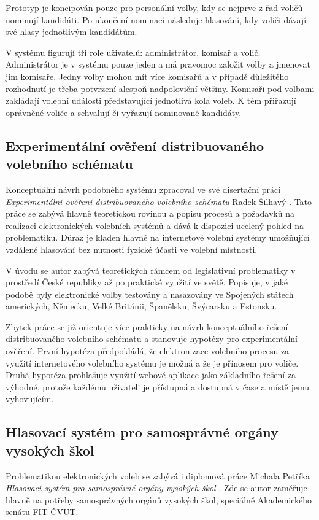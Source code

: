\documentclass[11pt,twoside,a4paper]{book}
\begin{document}
Prototyp je koncipován pouze pro personální volby, kdy se nejprve z řad voličů nominují kandidáti. Po ukončení nominací následuje hlasování, kdy voliči dávají své hlasy jednotlivým kandidátům. 

V systému figurují tři role uživatelů: administrátor, komisař a volič. Administrátor je v systému pouze jeden a má pravomoc založit volby a jmenovat jim komisaře. Jedny volby mohou mít více komisařů a v případě důležitého rozhodnutí je třeba potvrzení alespoň nadpoloviční většiny. Komisaři pod volbami zakládají volební události představující jednotlivá kola voleb. K těm přiřazují oprávněné voliče a schvalují či vyřazují nominované kandidáty.

\subsection{Experimentální ověření distribuovaného volebního schématu}
Konceptuální návrh podobného systému zpracoval ve své disertační práci \textit{Experimentální ověření distribuovaného
volebního schématu} Radek Šilhavý \cite{art:silhavy}. Tato práce se zabývá hlavně teoretickou rovinou a popisu procesů a požadavků na realizaci elektronických volebních systémů a dává k dispozici ucelený pohled na problematiku. Důraz je kladen hlavně na internetové volební systémy umožňující vzdálené hlasování bez nutnosti fyzické účasti ve volební místnosti.

V úvodu se autor zabývá teoretických rámcem od legislativní problematiky v prostředí České republiky až po praktické využití ve světě. Popisuje, v jaké podobě byly elektronické volby testovány a nasazovány ve Spojených státech amerických, Německu, Velké Británii, Španělsku, Švýcarsku a Estonsku.

Zbytek práce se již orientuje více prakticky na návrh konceptuálního řešení distribuovaného volebního schématu a stanovuje hypotézy pro experimentální ověření. První hypotéza předpokládá, že elektronizace volebního procesu za využití internetového volebního systému je možná a že je přínosem pro voliče. Druhá hypotéza prohlašuje využití webové aplikace jako základního řešení za výhodné, protože každému uživateli je přístupná a dostupná v čase a místě jemu vyhovujícím.

\subsection{Hlasovací systém pro samosprávné orgány vysokých škol}
Problematikou elektronických voleb se zabývá i diplomová práce Michala Petříka \textit{Hlasovací systém pro samosprávné orgány vysokých škol} \cite{art:petrik}. Zde se autor zaměřuje hlavně na potřeby samosprávných orgánů vysokých škol, speciálně Akademického senátu FIT ČVUT. 
\end{document}
